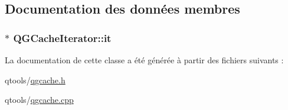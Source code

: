 \subsection{Documentation des données membres}
\hypertarget{class_q_g_cache_iterator_ac22be657c7cd8f63a5503c8ace720b0f}{}
\subsubsection[{it}]{$\ast$ Q\+G\+Cache\+Iterator\+::it\hspace{0.3cm}{\ttfamily [protected]}}\label{class_q_g_cache_iterator_ac22be657c7cd8f63a5503c8ace720b0f}


La documentation de cette classe a été générée à partir des fichiers suivants \+:\begin{DoxyCompactItemize}
\item 
qtools/\hyperlink{qgcache_8h}{qgcache.\+h}\item 
qtools/\hyperlink{qgcache_8cpp}{qgcache.\+cpp}\end{DoxyCompactItemize}
